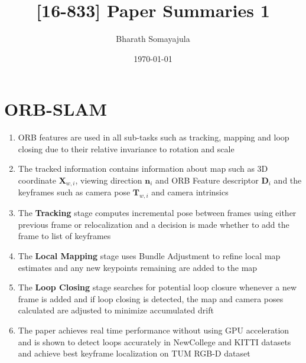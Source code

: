 \documentclass[12pt, a4paper]{article}
\title{[16-833] Paper Summaries 1}
\author{Bharath Somayajula}
\date{\today}
\begin{document}
\maketitle

\tableofcontents
\section{ORB-SLAM}
\begin{enumerate}
  \item  ORB features are used in all sub-tasks such as tracking, mapping and loop closing due to their relative invariance to rotation and scale
  \item The tracked information contains information about map such as 3D coordinate $\mathbf{X}_{w,i}$, viewing direction $\mathbf{n}_{i}$ and ORB Feature descriptor $\mathbf{D}_{i}$ and the keyframes such as camera pose $\mathbf{T}_{w,i}$ and camera intrinsics
  \item The \textbf{Tracking} stage computes incremental pose between frames using either previous frame or relocalization and a decision is made whether to add the frame to list of keyframes
  \item The \textbf{Local Mapping} stage uses Bundle Adjustment to refine local map estimates and any new keypoints remaining are added to the map
  \item The \textbf{Loop Closing} stage searches for potential loop closure whenever a new frame is added and if loop closing is detected, the map and camera poses calculated are adjusted to minimize accumulated drift
  \item The paper achieves real time performance without using GPU acceleration and is shown to detect loops accurately in NewCollege and KITTI datasets and achieve best keyframe localization on TUM RGB-D dataset
\end{enumerate}
\end{document}
